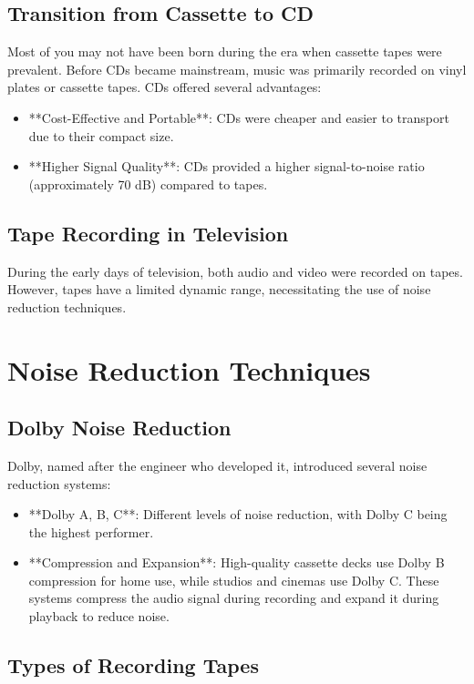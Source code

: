 \subsection{Transition from Cassette to CD}

Most of you may not have been born during the era when cassette tapes were prevalent. Before CDs became mainstream, music was primarily recorded on vinyl plates or cassette tapes. CDs offered several advantages:
\begin{itemize}
    \item **Cost-Effective and Portable**: CDs were cheaper and easier to transport due to their compact size.
    \item **Higher Signal Quality**: CDs provided a higher signal-to-noise ratio (approximately 70 dB) compared to tapes.
\end{itemize}

\subsection{Tape Recording in Television}

During the early days of television, both audio and video were recorded on tapes. However, tapes have a limited dynamic range, necessitating the use of noise reduction techniques.

\section{Noise Reduction Techniques}

\subsection{Dolby Noise Reduction}

Dolby, named after the engineer who developed it, introduced several noise reduction systems:
\begin{itemize}
    \item **Dolby A, B, C**: Different levels of noise reduction, with Dolby C being the highest performer.
    \item **Compression and Expansion**: High-quality cassette decks use Dolby B compression for home use, while studios and cinemas use Dolby C. These systems compress the audio signal during recording and expand it during playback to reduce noise.
\end{itemize}

\subsection{Types of Recording Tapes}

